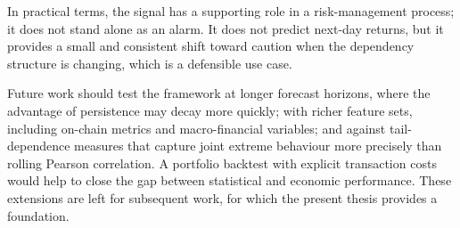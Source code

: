 In practical terms, the signal has a supporting role in a risk-management process; it does not stand alone as an alarm. It does not predict next-day returns, but it provides a small and consistent shift toward caution when the dependency structure is changing, which is a defensible use case.

Future work should test the framework at longer forecast horizons, where the advantage of persistence may decay more quickly; with richer feature sets, including on-chain metrics and macro-financial variables; and against tail-dependence measures that capture joint extreme behaviour more precisely than rolling Pearson correlation. A portfolio backtest with explicit transaction costs would help to close the gap between statistical and economic performance. These extensions are left for subsequent work, for which the present thesis provides a foundation.
